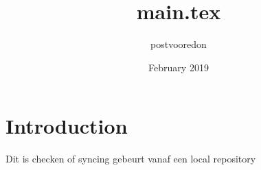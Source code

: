 \documentclass{article}
\title{main.tex}
\author{postvooredon }
\date{February 2019}
\begin{document}
\maketitle
\section{Introduction}
Dit is checken of syncing gebeurt vanaf een local repository
\end{document}
